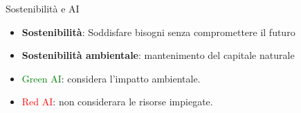 \begin{frame}{Sostenibilità e AI} 
        \begin{itemize}
                \item \textbf{Sostenibilità}: Soddisfare bisogni senza compromettere il futuro
                \item \textbf{Sostenibilità ambientale}: mantenimento del capitale naturale
                \item \textcolor{green}{Green AI}: considera l'impatto ambientale.
                \item \textcolor{red}{Red AI}: non considerara le risorse impiegate.
        \end{itemize}
\end{frame}

